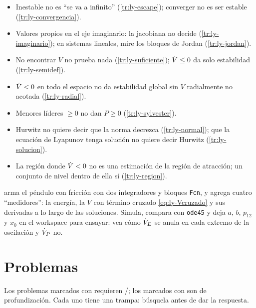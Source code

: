 \begin{trampa}[title={\faBug\hspace{0.45em}Las trampas del capítulo, en una caja}]{}
\begin{itemize}
  \item Inestable no es ``se va a infinito'' (\cref{tr:ly-escape}); converger no es ser estable (\cref{tr:ly-convergencia}).
  \item Valores propios en el eje imaginario: la jacobiana no decide (\cref{tr:ly-imaginario}); en sistemas lineales, mire los bloques de Jordan (\cref{tr:ly-jordan}).
  \item No encontrar $V$ no prueba nada (\cref{tr:ly-suficiente}); $\dot V\le0$ da solo estabilidad (\cref{tr:ly-semidef}).
  \item $\dot V<0$ en todo el espacio no da estabilidad global sin $V$ radialmente no acotada (\cref{tr:ly-radial}).
  \item Menores líderes $\ge0$ no dan $P\ge0$ (\cref{tr:ly-sylvester}).
  \item Hurwitz no quiere decir que la norma decrezca (\cref{tr:ly-normal}); que la ecuación de Lyapunov tenga solución no quiere decir Hurwitz (\cref{tr:ly-solucion}).
  \item La región donde $\dot V<0$ no es una estimación de la región de atracción; un conjunto de nivel dentro de ella sí (\cref{tr:ly-region}).
\end{itemize}
\end{trampa}

\begin{modelo}
 arma el péndulo con fricción con dos integradores y bloques \texttt{Fcn}, y agrega cuatro ``medidores'': la energía, la $V$ con término cruzado \eqref{eq:ly-Vcruzado} y sus derivadas a lo largo de las soluciones. Simula, compara con \texttt{ode45} y deja $a$, $b$, $p_{12}$ y $x_0$ en el workspace para ensayar: vea cómo $\dot V_E$ se anula en cada extremo de la oscilación y $\dot V_P$ no.
\end{modelo}

\section{Problemas}
\label{sec:ly-problemas}

Los problemas marcados con \etiquetaM{} requieren \matlab/\simulink; los marcados con \etiquetaEstrella{} son de profundización. Cada uno tiene una trampa: búsquela antes de dar la respuesta.

